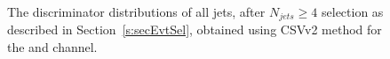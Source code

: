 \begin{center}
\begin{figure}
\caption{The \PQb discriminator distributions of all jets, after $N_{jets} \geq 4$ selection as described in Section~\ref{s:secEvtSel}, obtained using CSVv2 method for the \mujets and \ejets channel.}
\label{fig:pfCISV_lepBTag}
\end{figure}
\end{center}

